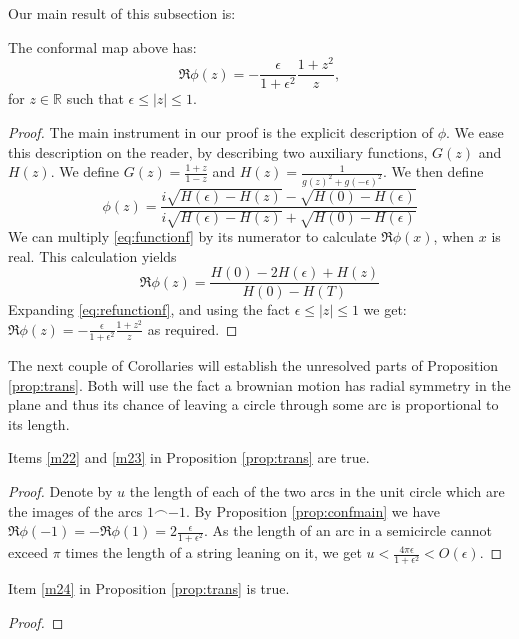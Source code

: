 {Our main result of this subsection is:
\begin{propos}\label{prop:confmain}
The conformal map above has:
$$\Re \phi(z) = -\frac{\epsilon}{1+\epsilon^2}\frac{1+z^2}{z},$$
for $z\in\mathbb{R}$ such that $\epsilon\le|z|\le1$.
\end{propos}
\begin{proof}
The main instrument in our proof is the explicit description of $\phi$.
We ease this description on the reader, by describing two
auxiliary functions, $G(z)$ and $H(z)$. We define $G(z)=\frac{1+z}{1-z}$
and $H(z)=\frac1{g(z)^2+g(-\epsilon)^2}$. We then define
\begin{equation}\label{eq:functionf}
\phi(z)=\frac{i\sqrt{H(\epsilon)-H(z)}-\sqrt{H(0)-H(\epsilon)}}{i\sqrt{H(\epsilon)-H(z)}+\sqrt{H(0)-H(\epsilon)}}
\end{equation}
We can multiply \eqref{eq:functionf} by its numerator to calculate $\Re \phi(x)$, when $x$ is real. This calculation yields
\begin{equation}\label{eq:refunctionf}
\Re \phi(z)=\frac{H(0)-2H(\epsilon)+H(z)}{H(0)-H(T)}
\end{equation}
Expanding \eqref{eq:refunctionf}, and using the fact $\epsilon\le |z|\le1$ we get:
$\Re \phi(z) = -\frac{\epsilon}{1+\epsilon^2}\frac{1+z^2}{z}$ as required.
\end{proof}

The next couple of Corollaries will establish the unresolved parts of Proposition \ref{prop:trans}. Both will use the fact a brownian motion has radial symmetry in the plane and thus its chance of leaving a circle through some arc is proportional to its length.

\begin{cor}\label{m22and23true}
Items \ref{m22} and \ref{m23} in Proposition \ref{prop:trans} are true.
\end{cor}
\begin{proof}
Denote by $u$ the length of each of the two arcs in the unit circle which are the images of the arcs $1\frown-1$. By Proposition \ref{prop:confmain} we have $\Re \phi(-1)=-\Re \phi(1)=2\frac{\epsilon}{1+\epsilon^2}$. As the length of an arc in a semicircle cannot exceed $\pi$ times the length of a string leaning on it, we get $u<\frac{4\pi\epsilon}{1+\epsilon^2}<O(\epsilon)$.
\end{proof}

\begin{cor}\label{m24true}
Item \ref{m24} in Proposition \ref{prop:trans} is true.
\end{cor}
\begin{proof}


\end{proof}}
